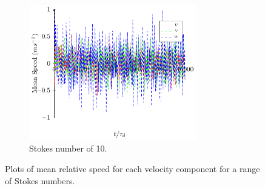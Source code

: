 \documentclass[../Interim_Report_Master]{subfiles}
\begin{document}
\begin{figure}[H]
\begin{subfigure}[t]{0.6\textwidth}
		\includegraphics[width=0.8\textwidth]{./Diagrams/Statistical_Verification_Test/stk_10/Statistical_Verification_Test_Velocity_stk_10.pdf}
		\caption{Stokes number of 10.}
		\label{rel_vel_stk_10}
	\end{subfigure}
\caption{Plots of mean relative speed for each velocity component for a range of Stokes numbers.}
\label{rel_vel}
\end{figure}
\end{document}

